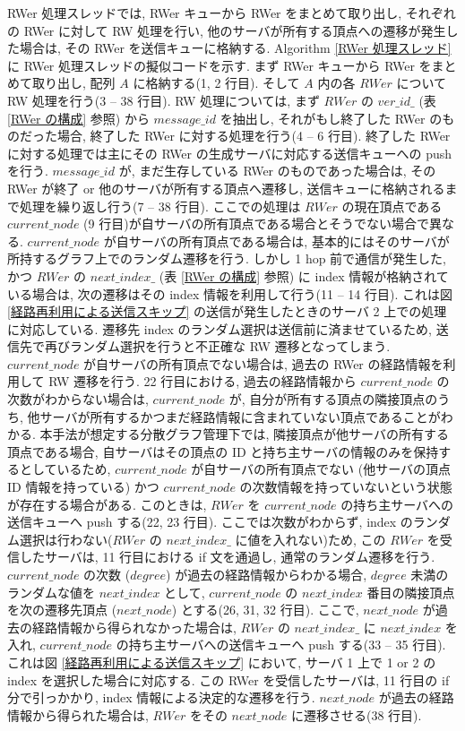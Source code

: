 RWer 処理スレッドでは, RWer キューから RWer をまとめて取り出し, それぞれの RWer に対して RW 処理を行い, 他のサーバが所有する頂点への遷移が発生した場合は, その RWer を送信キューに格納する. Algorithm \ref{RWer 処理スレッド} に RWer 処理スレッドの擬似コードを示す. まず RWer キューから RWer をまとめて取り出し, 配列 $A$ に格納する(1, 2 行目). そして $A$ 内の各 $RWer$ について RW 処理を行う(3 -- 38 行目). RW 処理については, まず $RWer$ の $ver\_id\_$ (表 \ref{RWer の構成} 参照) から $message\_id$ を抽出し, それがもし終了した RWer のものだった場合, 終了した RWer に対する処理を行う(4 -- 6 行目). 終了した RWer に対する処理では主にその RWer の生成サーバに対応する送信キューへの push を行う. $message\_id$ が, まだ生存している RWer のものであった場合は, その RWer が終了 or 他のサーバが所有する頂点へ遷移し, 送信キューに格納されるまで処理を繰り返し行う(7 -- 38 行目). ここでの処理は $RWer$ の現在頂点である $current\_node$ (9 行目)が自サーバの所有頂点である場合とそうでない場合で異なる. $current\_node$ が自サーバの所有頂点である場合は, 基本的にはそのサーバが所持するグラフ上でのランダム遷移を行う. しかし 1 hop 前で通信が発生した, かつ $RWer$ の $next\_index\_$ (表 \ref{RWer の構成} 参照) に index 情報が格納されている場合は, 次の遷移はその index 情報を利用して行う(11 -- 14 行目). これは図 \ref{経路再利用による送信スキップ} の送信が発生したときのサーバ 2 上での処理に対応している. 遷移先 index のランダム選択は送信前に済ませているため, 送信先で再びランダム選択を行うと不正確な RW 遷移となってしまう. $current\_node$ が自サーバの所有頂点でない場合は, 過去の RWer の経路情報を利用して RW 遷移を行う. 22 行目における, 過去の経路情報から $current\_node$ の次数がわからない場合は, $current\_node$ が, 自分が所有する頂点の隣接頂点のうち, 他サーバが所有するかつまだ経路情報に含まれていない頂点であることがわかる. 本手法が想定する分散グラフ管理下では, 隣接頂点が他サーバの所有する頂点である場合, 自サーバはその頂点の ID と持ち主サーバの情報のみを保持するとしているため, $current\_node$ が自サーバの所有頂点でない (他サーバの頂点 ID 情報を持っている) かつ $current\_node$ の次数情報を持っていないという状態が存在する場合がある. このときは, $RWer$ を $current\_node$ の持ち主サーバへの送信キューへ push する(22, 23 行目). ここでは次数がわからず, index のランダム選択は行わない($RWer$ の $next\_index\_$ に値を入れない)ため, この $RWer$ を受信したサーバは, 11 行目における if 文を通過し, 通常のランダム遷移を行う. $current\_node$ の次数 ($degree$) が過去の経路情報からわかる場合, $degree$ 未満のランダムな値を $next\_index$ として, $current\_node$ の $next\_index$ 番目の隣接頂点を次の遷移先頂点 ($next\_node$) とする(26, 31, 32 行目). ここで, $next\_node$ が過去の経路情報から得られなかった場合は, $RWer$ の $next\_index\_$ に $next\_index$ を入れ, $current\_node$ の持ち主サーバへの送信キューへ push する(33 -- 35 行目). これは図 \ref{経路再利用による送信スキップ} において, サーバ 1 上で 1 or 2 の index を選択した場合に対応する. この RWer を受信したサーバは, 11 行目の if 分で引っかかり, index 情報による決定的な遷移を行う. $next\_node$ が過去の経路情報から得られた場合は, $RWer$ をその $next\_node$ に遷移させる(38 行目). 
\\
\\
\\
\\

